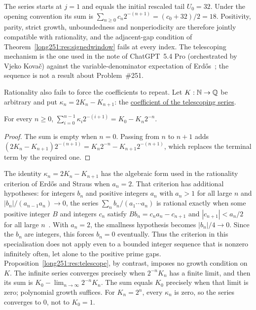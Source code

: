 \documentclass[11pt]{article}
\makeatletter
\newcommand{\compatlabel}[1]{\ltx@label{#1}}
\makeatother
\begin{document}
\noindent The series starts at $j=1$ and equals the initial rescaled tail
$U_0=32$.  Under the opening convention its sum is
$\sum_{n\ge0}c_n2^{-(n+1)}=(c_0+32)/2=18$.
Positivity, parity, strict growth, unboundedness and nonperiodicity are
therefore jointly compatible with rationality, and the adjacent-gap condition of
Theorem~\ref{long251:res:signedwindow} fails at every index.  The telescoping mechanism
is the one used in the note of ChatGPT~5.4 Pro (orchestrated by Vjeko
Kova\v{c}) against the variable-denominator expectation of
Erd\H{o}s~\cite[Theorem~1 and proof, pp.~1--2]{kovac2026}; the sequence is not a
result about Problem~\#251.

Rationality also fails to force the coefficients to repeat.  Let $K:\mathbb{N}\to\mathbb{Q}$ be
arbitrary and put $\kappa_n=2K_n-K_{n+1}$: the
\href{https://github.com/wcook04/plectis-erdos/blob/3d6d938d696fed0fb71dd55115a18a73738ff223/lean/ErdosProblems/Erdos251/PrimeGapDyadicTail.lean\#L1129}{coefficient of the telescoping series}.

\begin{proposition}\label{long251:res:telescope}\compatlabel{res:telescope}\compatlabel{sec:carry}
For every $n\ge0$,
$\sum_{i=0}^{n-1}\kappa_i2^{-(i+1)}=K_0-K_n2^{-n}$.
\end{proposition}

\begin{proof}
The sum is empty when $n=0$.  Passing from $n$ to $n+1$ adds
$(2K_n-K_{n+1})2^{-(n+1)}=K_n2^{-n}-K_{n+1}2^{-(n+1)}$,
which replaces the terminal term by the required one.
\end{proof}

\noindent The identity $\kappa_n=2K_n-K_{n+1}$ has the algebraic form used in
the rationality criterion of Erd\H{o}s and Straus when $a_n=2$.  That criterion
has additional hypotheses: for integers $b_n$ and
positive integers $a_n$ with $a_n>1$ for all large $n$ and
$|b_n|/(a_{n-1}a_n)\to0$, the series $\sum_nb_n/(a_1\cdots a_n)$ is rational
exactly when some positive integer $B$ and integers $c_n$ satisfy
$Bb_n=c_na_n-c_{n+1}$ and $|c_{n+1}|<a_n/2$ for all large
$n$~\cite[Theorem~2.1, pp.~85--86]{erdosstraus1974}.  With $a_n=2$,
the smallness hypothesis becomes $|b_n|/4\to0$.  Since the $b_n$ are
integers, this forces $b_n=0$ eventually.  Thus the criterion in this
specialisation does not apply even to a bounded integer sequence that
is nonzero infinitely often, let alone to the positive prime gaps.
Proposition~\ref{long251:res:telescope}, by contrast, imposes no growth
condition on $K$.  The infinite series converges precisely when
$2^{-n}K_n$ has a finite limit, and then its sum is
$K_0-\lim_{n\to\infty}2^{-n}K_n$.  The sum equals $K_0$ precisely when
that limit is zero; polynomial growth suffices.  For $K_n=2^n$, every
$\kappa_n$ is zero, so the series converges to $0$, not to $K_0=1$.
\end{document}
